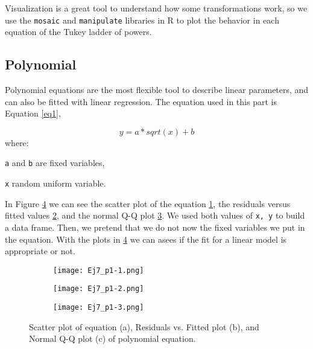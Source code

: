 \documentclass{article}
\begin{document}
Visualization is a great tool to understand how some transformations work, so we use the \texttt{mosaic} and \texttt{manipulate} libraries in R to plot the behavior in each equation of the Tukey ladder of powers. \\

\clearpage

\subsection{Polynomial}\label{poly}

Polynomial equations are the most flexible tool to describe linear parameters, and can also be fitted with linear regression. The equation used in this part is Equation \ref{eq1}, 

\begin{equation} \label{eq1}
y =  a * sqrt(x) + b
\end{equation}
where:
\begin{description}
\item \texttt{a} and \texttt{b} are fixed variables,
\item \texttt{x} random uniform variable.
\end{description}

In Figure \ref{fig2} we can see the scatter plot of the equation \ref{sb2-1}, the residuals versus fitted values \ref{sb2-2}, and the normal Q-Q plot \ref{sb2-3}. We used both values of \texttt{x, y} to build a data frame. Then, we pretend that we do not now the fixed variables we put in the equation. With the plots in \ref{fig2} we can asees if the fit for a linear model is appropriate or not.\\

\begin{figure}[]
\begin{subfigure}{.3\textwidth}
  \centering
  \texttt{[image: Ej7\_p1-1.png]}  
  \caption{ }
  \label{sb2-1}
\end{subfigure}
\begin{subfigure}{.3\textwidth}
  \centering
  \texttt{[image: Ej7\_p1-2.png]}  
  \caption{ }
  \label{sb2-2}
\end{subfigure}
\begin{subfigure}{.3\textwidth}
  \centering
  \texttt{[image: Ej7\_p1-3.png]}  
  \caption{ }
  \label{sb2-3}
\end{subfigure}
\caption{Scatter plot of equation (a), Residuals vs. Fitted plot (b), and Normal Q-Q plot (c) of polynomial equation.}
\label{fig2}
\end{figure}
\end{document}
